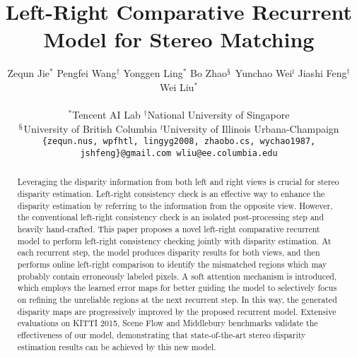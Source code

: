 \documentclass[10pt,twocolumn,letterpaper]{article}
\begin{document}
\title{Left-Right  Comparative Recurrent Model for Stereo Matching}

\author{Zequn Jie$^{*}$ \quad Pengfei Wang$^\dag$ \quad Yonggen Ling$^*$ \quad Bo Zhao$^\mathsection$ \quad Yunchao Wei$^\wr$ \quad Jiashi Feng$^\dag$ \quad Wei Liu$^*$ \\ \\
	$^*$Tencent AI Lab \quad  $^\dag$National University of Singapore \\ $^\mathsection$University of British  Columbia \quad $^\wr$University of Illinois Urbana-Champaign \\ {\tt\small \{zequn.nus, wpfhtl, lingyg2008, zhaobo.cs,  wychao1987, jshfeng\}@gmail.com \quad wliu@ee.columbia.edu}
}
\maketitle
\thispagestyle{empty}

\begin{abstract}
	Leveraging the disparity information from both  left and right views is crucial for stereo disparity estimation. Left-right consistency check is an effective way to enhance the disparity estimation by referring to the information from the opposite view. However, the conventional left-right consistency check is an isolated post-processing step and heavily hand-crafted. This paper proposes a novel left-right comparative recurrent model to perform left-right consistency checking jointly with   disparity estimation. At each recurrent step, the model produces disparity results for both views, and then performs online left-right comparison to identify the mismatched regions which may probably contain erroneously labeled pixels. A soft attention mechanism is introduced, which employs the learned error maps for better guiding the model to selectively focus on refining the unreliable regions at the next recurrent step. In this way, the generated disparity maps are progressively improved by the proposed recurrent model. Extensive evaluations on  KITTI 2015, Scene Flow and Middlebury benchmarks validate the effectiveness of our model,  demonstrating that state-of-the-art stereo disparity estimation results can be achieved by this new model.
\end{abstract}
\end{document}
